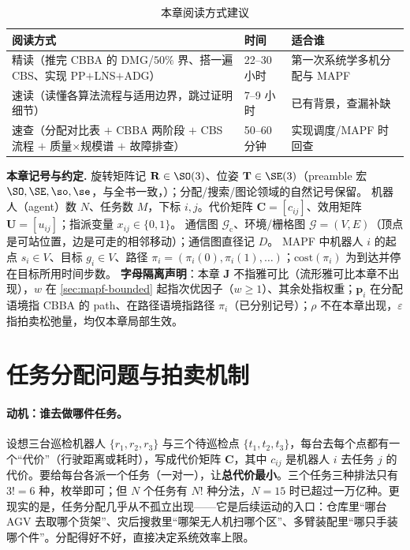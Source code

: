 \begin{table}[H]\centering\small
\caption{本章阅读方式建议}
\label{tab:mapf-reading}
\begin{tabularx}{\linewidth}{LlL}
\toprule
阅读方式 & 时间 & 适合谁 \\
\midrule
精读（推完 CBBA 的 DMG/$50\%$ 界、搭一遍 CBS、实现 PP$+$LNS$+$ADG） & 22--30 小时 & 第一次系统学多机分配与 MAPF \\
速读（读懂各算法流程与适用边界，跳过证明细节） & 7--9 小时 & 已有背景，查漏补缺 \\
速查（分配对比表 $+$ CBBA 两阶段 $+$ CBS 流程 $+$ 质量$\times$规模谱 $+$ 故障排查） & 50--60 分钟 & 实现调度/MAPF 时回查 \\
\bottomrule
\end{tabularx}
\end{table}

\begin{note}
\textbf{本章记号与约定.}\;
旋转矩阵记 $\mathbf{R}\in\SO(3)$、位姿 $\mathbf{T}\in\SE(3)$（preamble 宏 $\SO,\SE,\so,\se$，与全书一致，）；分配/搜索/图论领域的自然记号保留。
机器人（agent）数 $N$、任务数 $M$，下标 $i,j$。代价矩阵 $\mathbf{C}=[c_{ij}]$、效用矩阵 $\mathbf{U}=[u_{ij}]$；指派变量 $x_{ij}\in\{0,1\}$。
通信图 $\mathcal{G}_{\mathrm{c}}$、环境/栅格图 $\mathcal{G}=(V,E)$（顶点是可站位置，边是可走的相邻移动）；通信图直径记 $D$。
MAPF 中机器人 $i$ 的起点 $s_i\in V$、目标 $g_i\in V$、路径 $\pi_i=(\pi_i(0),\pi_i(1),\dots)$；$\mathrm{cost}(\pi_i)$ 为到达并停在目标所用时间步数。
\textbf{字母隔离声明}：本章 $\mathbf{J}$ 不指雅可比（流形雅可比本章不出现），$w$ 在 \cref{sec:mapf-bounded} 起指次优因子（$w\ge 1$）、其余处指权重；$\mathbf{p}_i$ 在分配语境指 CBBA 的 path、在路径语境指路径 $\pi_i$（已分别记号）；$\rho$ 不在本章出现，$\varepsilon$ 指拍卖松弛量，均仅本章局部生效。
\end{note}

\section{任务分配问题与拍卖机制}
\label{sec:mapf-assign}

\paragraph{动机：谁去做哪件任务。}
设想三台巡检机器人 $\{r_1,r_2,r_3\}$ 与三个待巡检点 $\{t_1,t_2,t_3\}$，每台去每个点都有一个“代价”（行驶距离或耗时），写成代价矩阵 $\mathbf{C}$，其中 $c_{ij}$ 是机器人 $i$ 去任务 $j$ 的代价。要给每台各派一个任务（一对一），让\textbf{总代价最小}。三个任务三种排法只有 $3!=6$ 种，枚举即可；但 $N$ 个任务有 $N!$ 种分法，$N=15$ 时已超过一万亿种。更现实的是，任务分配几乎从不孤立出现——它是后续运动的入口：仓库里“哪台 AGV 去取哪个货架”、灾后搜救里“哪架无人机扫哪个区”、多臂装配里“哪只手装哪个件”。分配得好不好，直接决定系统效率上限。

